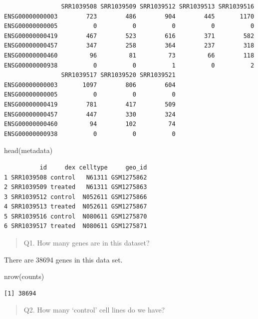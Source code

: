 \documentclass[
  letterpaper,
  DIV=11,
  numbers=noendperiod]{scrartcl}
\newenvironment{Shaded}{\begin{snugshade}}{\end{snugshade}}
\newcommand{\FunctionTok}[1]{\textcolor[rgb]{0.28,0.35,0.67}{#1}}
\newcommand{\NormalTok}[1]{\textcolor[rgb]{0.00,0.23,0.31}{#1}}
\begin{document}
\begin{verbatim}
                SRR1039508 SRR1039509 SRR1039512 SRR1039513 SRR1039516
ENSG00000000003        723        486        904        445       1170
ENSG00000000005          0          0          0          0          0
ENSG00000000419        467        523        616        371        582
ENSG00000000457        347        258        364        237        318
ENSG00000000460         96         81         73         66        118
ENSG00000000938          0          0          1          0          2
                SRR1039517 SRR1039520 SRR1039521
ENSG00000000003       1097        806        604
ENSG00000000005          0          0          0
ENSG00000000419        781        417        509
ENSG00000000457        447        330        324
ENSG00000000460         94        102         74
ENSG00000000938          0          0          0
\end{verbatim}

\begin{Shaded}
\begin{Highlighting}[]
\FunctionTok{head}\NormalTok{(metadata)}
\end{Highlighting}
\end{Shaded}

\begin{verbatim}
          id     dex celltype     geo_id
1 SRR1039508 control   N61311 GSM1275862
2 SRR1039509 treated   N61311 GSM1275863
3 SRR1039512 control  N052611 GSM1275866
4 SRR1039513 treated  N052611 GSM1275867
5 SRR1039516 control  N080611 GSM1275870
6 SRR1039517 treated  N080611 GSM1275871
\end{verbatim}

\begin{quote}
Q1. How many genes are in this dataset?
\end{quote}

There are 38694 genes in this data set.

\begin{Shaded}
\begin{Highlighting}[]
\FunctionTok{nrow}\NormalTok{(counts)}
\end{Highlighting}
\end{Shaded}

\begin{verbatim}
[1] 38694
\end{verbatim}

\begin{quote}
Q2. How many `control' cell lines do we have?
\end{quote}
\end{document}
